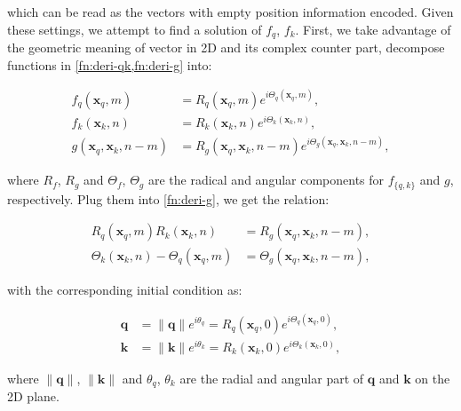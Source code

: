 which can be read as the vectors with empty position information encoded. Given these settings, we attempt to find a solution of $f_q$, $f_k$.  First, we take advantage of the geometric meaning of vector in 2D and its complex counter part, decompose functions in \ref{fn:deri-qk,fn:deri-g} into:

\begin{equation}
	\begin{aligned}
		f_q({\boldsymbol x}_q, m) &= R_q({\boldsymbol x}_q, m)e^{i\Theta_q({\boldsymbol x}_q, m)}, \\
		f_k({\boldsymbol x}_k, n) &= R_k({\boldsymbol x}_k, n)e^{i\Theta_k({\boldsymbol x}_k, n)}, \\
		g({\boldsymbol x}_q, {\boldsymbol x}_k, n - m) &= R_g({\boldsymbol x}_q, {\boldsymbol x}_k, n - m)e^{i\Theta_g({\boldsymbol x}_q, {\boldsymbol x}_k, n - m)},
	\end{aligned}
\end{equation}

where $R_f$, $R_g$ and $\Theta_f$, $\Theta_g$ are the radical and angular components for $f_{\{q, k\}}$ and $g$, respectively. Plug them into \ref{fn:deri-g}, we get the relation:

\begin{equation}
	\begin{aligned}
		R_q({\boldsymbol x}_q, m)R_k({\boldsymbol x}_k, n) &= R_g({\boldsymbol x}_q, {\boldsymbol x}_k, n - m), \\
		\Theta_k({\boldsymbol x}_k, n) - \Theta_q({\boldsymbol x}_q, m) &= \Theta_g({\boldsymbol x}_q, {\boldsymbol x}_k, n - m),
	\end{aligned}
	\label{fn:deri-rtheta}
\end{equation}

with the corresponding initial condition as:

\begin{equation}
	\begin{aligned}
		{\boldsymbol q} &= \|{\boldsymbol q}\|e^{i\theta_q} = R_q({\boldsymbol x}_q, 0)e^{i\Theta_q({\boldsymbol x}_q, 0)},\\
		{\boldsymbol k} & = \|{\boldsymbol k}\|e^{i\theta_k} = R_k({\boldsymbol x}_k, 0)e^{i\Theta_k({\boldsymbol x}_k, 0)},
	\end{aligned}
	\label{fn:deri-initCond2}
\end{equation}

where $\|{\boldsymbol q}\|$, $\|{\boldsymbol k}\|$ and $\theta_q$, $\theta_k$ are the radial and angular part of ${\boldsymbol q}$ and ${\boldsymbol k}$ on the 2D plane.

